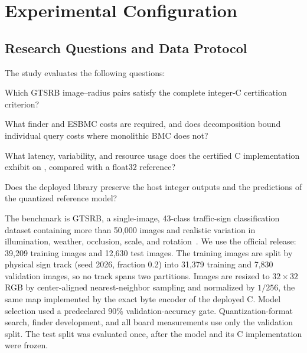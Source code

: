 \section{Experimental Configuration}
\label{sec:setup}

\subsection{Research Questions and Data Protocol}

The study evaluates the following questions:

\begin{tcolorbox}[
    colback=gray!10,
    colframe=gray!50,
    boxrule=0.5pt,
    arc=1mm,
    left=2mm,
    right=2mm,
    top=1mm,
    bottom=1mm
]
\begin{description}[leftmargin=0.55cm,labelsep=0.2em,itemsep=1pt,topsep=0pt]
  \item[RQ1:] Which GTSRB image--radius pairs satisfy the complete integer-C certification criterion?
  \item[RQ2:] What finder and ESBMC costs are required, and does decomposition bound individual query costs where monolithic BMC does not?
  \item[RQ3:] What latency, variability, and resource usage does the certified C implementation exhibit on \AAOS{}, compared with a float32 reference?
  \item[RQ4:] Does the deployed library preserve the host integer outputs and the predictions of the quantized reference model?
\end{description}
\end{tcolorbox}

The benchmark is GTSRB, a single-image, 43-class traffic-sign classification dataset containing more than 50,000 images and realistic variation in illumination, weather, occlusion, scale, and rotation~\cite{Stallkamp2011GTSRB}. We use the official release: 39,209 training images and 12,630 test images. The training images are split by physical sign track (seed 2026, fraction 0.2) into 31,379 training and 7,830 validation images, so no track spans two partitions. Images are resized to $32\times32$ RGB by center-aligned nearest-neighbor sampling and normalized by $1/256$, the same map implemented by the exact byte encoder of the deployed C. Model selection used a predeclared 90\% validation-accuracy gate. Quantization-format search, finder development, and all board measurements use only the validation split. The test split was evaluated once, after the model and its C implementation were frozen.

